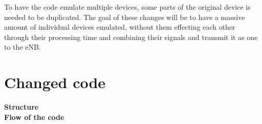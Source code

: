 To have the code emulate multiple devices, some parts of the original device is needed to be duplicated. The goal of these changes will be to have a massive amount of individual devices emulated, without them effecting each other through their processing time and combining their signals and transmit it as one to the eNB.

\section{Changed code}

\textbf{Structure}\\
\textbf{Flow of the code}\\